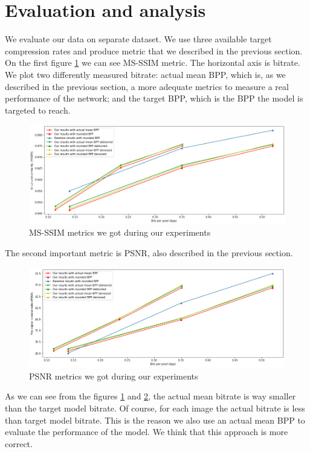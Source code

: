 \section{Evaluation and analysis}

We evaluate our data on separate dataset. We use three available target compression rates and produce metric that we described in the previous section. On the first figure \ref{mssim} we can see MS-SSIM metric. The horizontal axis is bitrate. We plot two differently measured bitrate: actual mean BPP, which is, as we described in the previous section, a more adequate metrics to measure a real performance of the network; and the target BPP, which is the BPP the model is targeted to reach.

\begin{figure}[!ht]
    \centering
    \includegraphics[width=\textwidth]{figure/mssim.png}
    \caption{MS-SSIM metrics we got during our experiments}
    \label{mssim}
\end{figure}

The second important metric is PSNR, also described in the previous section.

\begin{figure}[!ht]
    \centering
    \includegraphics[width=\textwidth]{figure/psnr.png}
    \caption{PSNR metrics we got during our experiments}
    \label{psnr}
\end{figure}

As we can see from the figures \ref{mssim} and \ref{psnr}, the actual mean bitrate is way smaller than the target model bitrate. Of course, for each image the actual bitrate is less than target model bitrate. This is the reason we also use an actual mean BPP to evaluate the performance of the model. We think that this approach is more correct.

